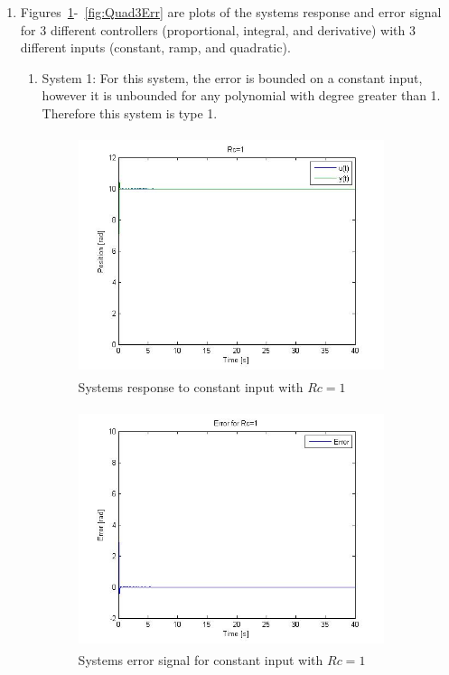 \documentclass[letterpaper, 11pt, openany]{book}
\begin{document}
\begin{enumerate}
\item Figures~\ref{fig:Const1}-~\ref{fig:Quad3Err} are plots of the systems response and error signal for 3 
different controllers (proportional, integral, and derivative) with 3 different inputs (constant, ramp, and quadratic). 
\begin{enumerate}
\item System 1: For this system, the error is bounded on a constant input, however it is unbounded for any polynomial 
with degree greater than 1. Therefore this system is type 1. \\

\begin{figure}[htbp]%
\centering
\includegraphics[width=0.9\textwidth, height = 7cm]{graphics/Const1.jpg} 
\caption{Systems response to constant input with $Rc = 1$}\label{fig:Const1}
\end{figure}

\begin{figure}[htbp]%
\centering
\includegraphics[width=0.9\textwidth, height = 7cm]{graphics/Const1Err.jpg} 
\caption{Systems error signal for constant input with $Rc = 1$}\label{fig:Const1Err}
\end{figure}


\end{enumerate}
\end{enumerate}
\end{document}
